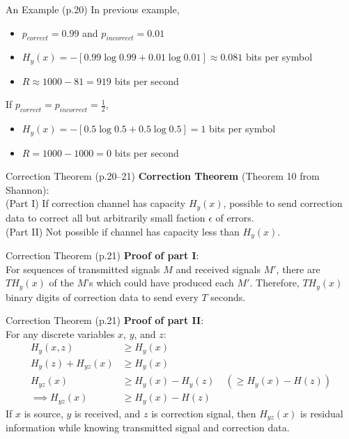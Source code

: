 \documentclass{beamer}
\begin{document}
  \begin{frame}{An Example \small (p.20)}
    In previous example,
    \begin{itemize}
      \item $p_{correct} = 0.99$ and $p_{incorrect} = 0.01$
      \item $H_y(x) = -\left[ 0.99 \log 0.99 + 0.01 \log 0.01 \right] \approx 0.081$ bits per symbol
      \item $R \approx 1000 - 81 = 919$ bits per second
    \end{itemize}
    If $p_{correct} = p_{incorrect} = \frac{1}{2}$,
    \begin{itemize}
      \item $H_y(x) = -\left[ 0.5 \log 0.5 + 0.5 \log 0.5 \right] = 1$ bits per symbol
      \item $R = 1000 - 1000 = 0$ bits per second
    \end{itemize}
  \end{frame}

  \begin{frame}{Correction Theorem \small (p.20--21)}
    \textbf{Correction Theorem} {\footnotesize (Theorem 10 from Shannon)}: \\
    (Part I) If correction channel has capacity $H_y(x)$, possible to send correction
    data to correct all but arbitrarily small faction $\epsilon$ of errors. \\
    (Part II) Not possible if channel has capacity less than $H_y(x)$.
  \end{frame}

  \begin{frame}{Correction Theorem \small (p.21)}
    \textbf{Proof of part I}: \\
    For sequences of transmitted signals $M$ and received signals $M'$, there
    are $T H_y(x)$ of the $M$'s which could have produced each $M'$.
    Therefore, $T H_y(x)$ binary digits of correction data to send every $T$
    seconds.
  \end{frame}

  \begin{frame}{Correction Theorem \small (p.21)}
    \textbf{Proof of part II}: \\
    For any discrete variables $x$, $y$, and $z$:
    \begin{align}
      H_y(x, z) &\ge H_y(x) & \\
      H_y(z) + H_{yz}(x) &\ge H_y(x) & \\
      H_{yz}(x) &\ge H_y(x) - H_y(z) &\; \left( \ge H_y(x) - H(z) \right) \\
      \implies H_{yz}(x) &\ge H_y(x) - H(z) &
    \end{align}
    If $x$ is source, $y$ is received, and $z$ is correction signal, then
    $H_{yz}(x)$ is residual information while knowing transmitted signal and
    correction data.
  \end{frame}
\end{document}
